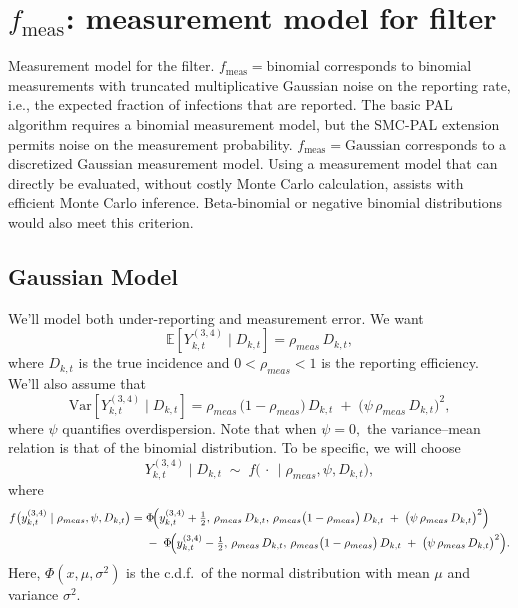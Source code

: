 \documentclass{article}
\newcommand\fmeas{f_{\mathrm{meas}}}
\newcommand\fmeasBinomial{\mathrm{binomial}}
\newcommand\fmeasGaussian{\mathrm{Gaussian}}
\begin{document}
\section{$\fmeas$: measurement model for filter}

Measurement model for the filter. $\fmeas=\fmeasBinomial$ corresponds to binomial measurements with truncated multiplicative Gaussian noise on the reporting rate, i.e., the expected fraction of infections that are reported. 
The basic PAL algorithm requires a binomial measurement model, but the SMC-PAL extension permits noise on the measurement probability.
$\fmeas=\fmeasGaussian$ corresponds to a discretized Gaussian measurement model. 
Using a measurement model that can directly be evaluated, without costly Monte Carlo calculation, assists with efficient Monte Carlo inference.
Beta-binomial or negative binomial distributions would also meet this criterion.

\subsection{Gaussian Model}

We'll model both under-reporting and measurement error. We want 
\[
\mathbb{E}[Y_{k,t}^{(3,4)} \mid D_{k,t}] = \rho_{meas}\,D_{k,t},
\]
where \(D_{k,t}\) is the true incidence and 
\(0 < \rho_{meas} < 1\) is the reporting efficiency. We'll also assume that 
\[
\mathrm{Var}[Y_{k,t}^{(3,4)} \mid D_{k,t}] 
= \rho_{meas}\,\bigl(1 - \rho_{meas}\bigr)\,D_{k,t} 
\;+\; 
\bigl(\psi\,\rho_{meas}\,D_{k,t}\bigr)^{2},
\]
where \(\psi\) quantifies overdispersion. Note that when \(\psi = 0,\) the 
variance--mean relation is that of the binomial distribution. To be specific, 
we will choose 
\[
Y_{k,t}^{(3,4)} \mid D_{k,t} 
\;\sim\; 
f\bigl(\,\cdot\,\mid \rho_{meas},\psi,D_{k,t}\bigr),
\]
where
\[
\begin{aligned}
f\bigl(y_{k,t}^{(3,4)} \mid \rho_{meas},\psi,D_{k,t}\bigr)
=\;& \Phi\!\Bigl(
y_{k,t}^{(3,4)} + \tfrac{1}{2},\,
\rho_{meas}\,D_{k,t},\,
\rho_{meas}\bigl(1-\rho_{meas}\bigr)\,D_{k,t} 
\;+\; 
\bigl(\psi\,\rho_{meas}\,D_{k,t}\bigr)^{2}
\Bigr)
\\
&-\;\Phi\!\Bigl(
y_{k,t}^{(3,4)} - \tfrac{1}{2},\,
\rho_{meas}\,D_{k,t},\,
\rho_{meas}\bigl(1-\rho_{meas}\bigr)\,D_{k,t} 
\;+\; 
\bigl(\psi\,\rho_{meas}\,D_{k,t}\bigr)^{2}
\Bigr).
\end{aligned}
\]
Here, \(\Phi(x,\mu,\sigma^{2})\) is the c.d.f.\ of the normal distribution with 
mean \(\mu\) and variance \(\sigma^{2}\).
\end{document}
